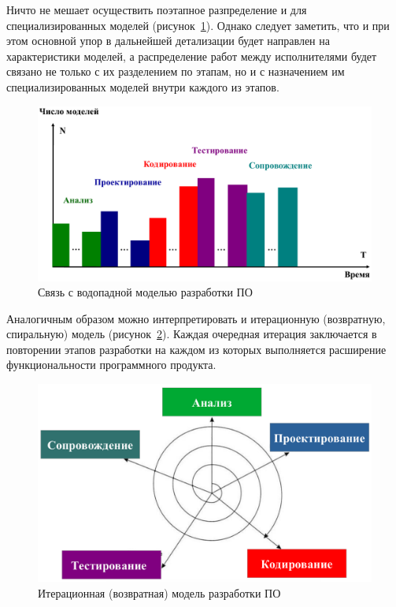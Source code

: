 Ничто не мешает осуществить поэтапное разпределение и для специализированных моделей (рисунок~\ref{fdiag07}). Однако следует заметить, что и при этом основной упор в дальнейшей детализации будет направлен на характеристики моделей, а распределение работ между исполнителями будет связано не только с их разделением по этапам, но и с назначением им специализированных моделей внутри каждого из этапов.

\begin{figure}[htbp]
    \centering
    \includegraphics[width=1.0\textwidth]{img/fdiag07.png}
    \caption{Связь с водопадной моделью разработки ПО}
    \label{fdiag07}
\end{figure}

Аналогичным образом можно интерпретировать и итерационную (возвратную, спиральную) модель (рисунок~\ref{fdiag08}). Каждая очередная итерация заключается в повторении этапов разработки на каждом из которых выполняется расширение функциональности программного продукта.

\begin{figure}[htbp]
    \centering
    \includegraphics[width=1.0\textwidth]{img/fdiag08.png}
    \caption{Итерационная (возвратная) модель разработки ПО}
    \label{fdiag08}
\end{figure}

